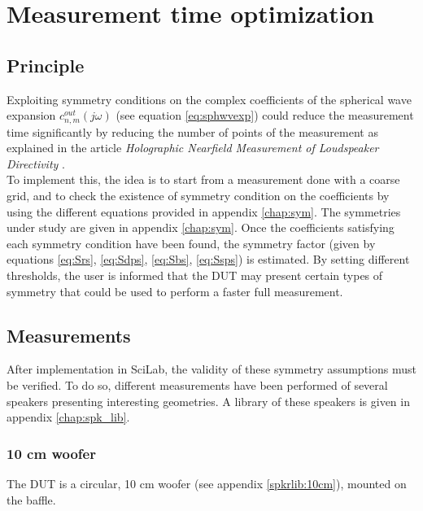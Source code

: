 \documentclass{report}
\begin{document}

\chapter{Measurement time optimization}

\section{Principle}

Exploiting symmetry conditions on the complex coefficients of the spherical wave expansion $c_{n,m}^{out}(j \omega)$ (see equation \ref{eq:sphwvexp}) could reduce the measurement time significantly by reducing the number of points of the measurement as explained in the article \textit{Holographic Nearfield Measurement of Loudspeaker Directivity} \citep[][sect.~4]{aeshs}. \\

To implement this, the idea is to start from a measurement done with a coarse grid, and to check the existence of symmetry condition on the coefficients by using the different equations provided in appendix \ref{chap:sym}. The symmetries under study are given in appendix \ref{chap:sym}.
Once the coefficients satisfying each symmetry condition have been found, the symmetry factor (given by equations \ref{eq:Srs}, \ref{eq:Sdps}, \ref{eq:Sbs}, \ref{eq:Ssps}) is estimated. By setting different thresholds, the user is informed that the DUT may present certain types of symmetry that could be used to perform a faster full measurement.

\section{Measurements}

After implementation in SciLab, the validity of these symmetry assumptions must be verified. To do so, different measurements have been performed of several speakers presenting interesting geometries. A library of these speakers is given in appendix \ref{chap:spk_lib}. 

\subsection{10 cm woofer}

The DUT is a circular, 10 cm woofer (see appendix \ref{spkrlib:10cm}), mounted on the baffle. \\
\end{document}
